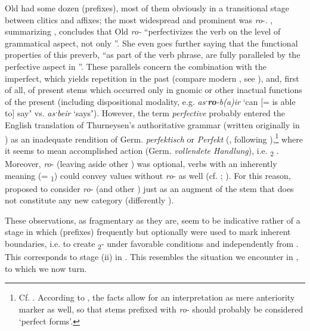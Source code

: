 \documentclass[output=paper]{langsci/langscibook}
\begin{document}
Old  had some dozen  (prefixes), most of them obviously in a transitional stage between clitics and affixes; the most widespread and prominent was \textit{ro}-. \citet[104]{Gvozdanović2015}, summarizing \citet[339--348]{Thurneysen1975[1946]}, concludes that Old  \textit{ro-} “perfectivizes the verb on the level of grammatical aspect, not only ”. She even goes further saying that the functional properties of this preverb, “as part of the verb phrase, are fully paralleled by the perfective aspect in ”. These parallels concern the combination with the imperfect, which yields repetition in the past (compare modern , see ), and, first of all,  of present  stems which occurred only in gnomic or other inactual functions of the present (including dispositional modality, e.g. \textit{asˑ\textbf{{ro}}-b(a)ir} ‘can [= is able to] sayʼ vs. \textit{asˑbeir} ‘saysʼ). However, the term \textit{perfective} probably entered the English translation of Thurneysen’s authoritative grammar (written originally in ) as an inadequate rendition of Germ. \textit{perfektisch} or \textit{Perfekt} (\citealt[251]{Lambert1995}, following \citealt{McCone1987}),\footnote{Cf. \citet[319]{Thurneysen1909}. According to \citet[252]{West1981-1982}, the facts allow for an interpretation as mere anteriority marker as well, so that stems prefixed with \textit{ro}- should probably be considered ‘perfect forms’.} where it seems to mean accomplished action (Germ. \textit{vollendete Handlung}), i.e. \textsubscript{2} . Moreover, \textit{ro}- (leaving aside other ) was optional, verbs with an inherently  meaning (= \textsubscript{1}) could convey  values without \textit{ro}- as well (cf. \citealt[141f., 245--248]{Lewis1937}; \citealt[231--239]{Lambert1995}). For this reason, \citet[81]{Schumacher2004} proposed to consider \textit{ro}- (and other ) just as an augment of the stem that does not constitute any new category (differently \citealt[251f.]{Lambert1995}).

These observations, as fragmentary as they are, seem to be indicative rather of a stage in which  (prefixes) frequently but optionally were used to mark inherent boundaries, i.e. to create \textsubscript{2}- under favorable conditions and independently from . This corresponds to stage (ii) in . This resembles the situation we encounter in , to which we now turn.
\end{document}
